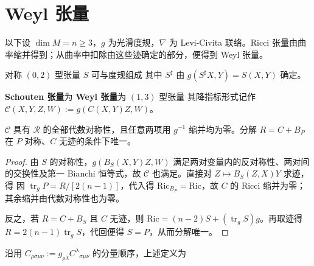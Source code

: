 \section{Weyl 张量}

以下设 $\dim M=n\geqslant3$，$g$ 为光滑度规，$\nabla$ 为 Levi-Civita 联络。Ricci 张量由曲率缩并得到；从曲率中扣除由这些迹确定的部分，便得到 Weyl 张量。

对称 $(0,2)$ 型张量 $S$ 可与度规组成
其中 $S^\sharp$ 由 $g(S^\sharp X,Y)=S(X,Y)$ 确定。

\begin{definition}
    \textbf{Schouten 张量}为
    \textbf{Weyl 张量}为 $(1,3)$ 型张量
    其降指标形式记作 $\mathcal C(X,Y,Z,W):=g(C(X,Y)Z,W)$。
\end{definition}

\begin{theorem}[曲率的迹分解]
    $\mathcal C$ 具有 $\mathcal R$ 的全部代数对称性，且任意两项用 $g^{-1}$ 缩并均为零。分解 $R=C+B_P$ 在 $P$ 对称、$C$ 无迹的条件下唯一。
\end{theorem}
\begin{proof}
    由 $S$ 的对称性，$g(B_S(X,Y)Z,W)$ 满足两对变量内的反对称性、两对间的交换性及第一 Bianchi 恒等式，故 $\mathcal C$ 也满足。直接对 $Z\mapsto B_S(Z,X)Y$ 求迹，得
    因 $\operatorname{tr}_gP=R/[2(n-1)]$，代入得 $\mathrm{Ric}_{B_P}=\mathrm{Ric}$，故 $C$ 的 Ricci 缩并为零；其余缩并由代数对称性也为零。

    反之，若 $R=C+B_S$ 且 $C$ 无迹，则 $\mathrm{Ric}=(n-2)S+(\operatorname{tr}_gS)g$。再取迹得 $R=2(n-1)\operatorname{tr}_gS$，代回便得 $S=P$，从而分解唯一。
\end{proof}

沿用 $C_{\rho\sigma\mu\nu}:=g_{\rho\lambda}C^\lambda{}_{\sigma\mu\nu}$ 的分量顺序，上述定义为

